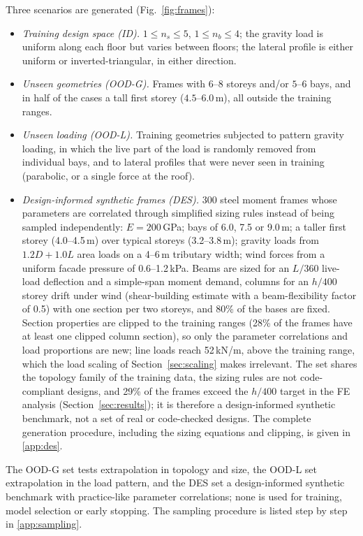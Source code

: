 Three scenarios are generated (Fig.~\ref{fig:frames}):
\begin{itemize}
\item \emph{Training design space (ID).} $1\le n_s\le 5$, $1\le n_b\le 4$; the gravity load is uniform along each floor but varies between floors; the lateral profile is either uniform or inverted-triangular, in either direction.
\item \emph{Unseen geometries (OOD-G).} Frames with $6$--$8$ storeys and/or $5$--$6$ bays, and in half of the cases a tall first storey ($4.5$--$6.0$\,m), all outside the training ranges.
\item \emph{Unseen loading (OOD-L).} Training geometries subjected to pattern gravity loading, in which the live part of the load is randomly removed from individual bays, and to lateral profiles that were never seen in training (parabolic, or a single force at the roof).
\item \emph{Design-informed synthetic frames (DES).} 300 steel moment frames whose parameters are correlated through simplified sizing rules instead of being sampled independently: $E=200$\,GPa; bays of 6.0, 7.5 or 9.0\,m; a taller first storey (4.0--4.5\,m) over typical storeys (3.2--3.8\,m); gravity loads from $1.2D+1.0L$ area loads on a 4--6\,m tributary width; wind forces from a uniform facade pressure of 0.6--1.2\,kPa. Beams are sized for an $L/360$ live-load deflection and a simple-span moment demand, columns for an $h/400$ storey drift under wind (shear-building estimate with a beam-flexibility factor of 0.5) with one section per two storeys, and 80\% of the bases are fixed. Section properties are clipped to the training ranges (28\% of the frames have at least one clipped column section), so only the parameter correlations and load proportions are new; line loads reach 52\,kN/m, above the training range, which the load scaling of Section~\ref{sec:scaling} makes irrelevant. The set shares the topology family of the training data, the sizing rules are not code-compliant designs, and 29\% of the frames exceed the $h/400$ target in the FE analysis (Section~\ref{sec:results}); it is therefore a design-informed synthetic benchmark, not a set of real or code-checked designs. The complete generation procedure, including the sizing equations and clipping, is given in \ref{app:des}.
\end{itemize}
The OOD-G set tests extrapolation in topology and size, the OOD-L set extrapolation in the load pattern, and the DES set a design-informed synthetic benchmark with practice-like parameter correlations; none is used for training, model selection or early stopping. The sampling procedure is listed step by step in \ref{app:sampling}.

